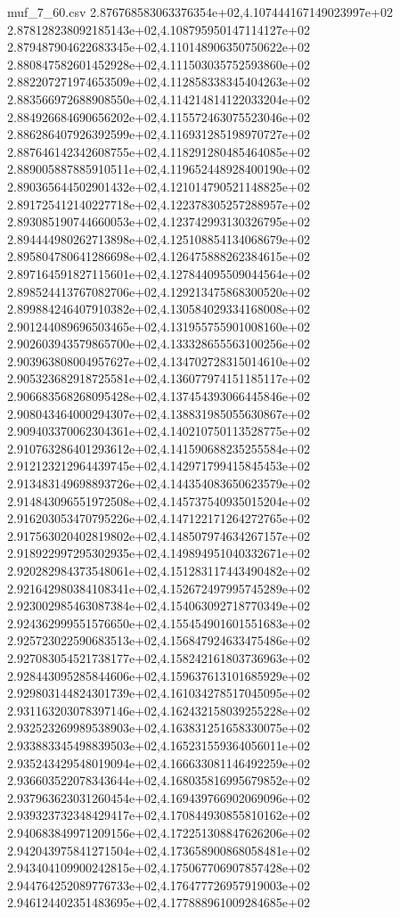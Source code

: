 \begin{filecontents*}{muf_7_60.csv}
2.876768583063376354e+02,4.107444167149023997e+02
2.878128238092185143e+02,4.108795950147114127e+02
2.879487904622683345e+02,4.110148906350750622e+02
2.880847582601452928e+02,4.111503035752593860e+02
2.882207271974653509e+02,4.112858338345404263e+02
2.883566972688908550e+02,4.114214814122033204e+02
2.884926684690656202e+02,4.115572463075523046e+02
2.886286407926392599e+02,4.116931285198970727e+02
2.887646142342608755e+02,4.118291280485464085e+02
2.889005887885910511e+02,4.119652448928400190e+02
2.890365644502901432e+02,4.121014790521148825e+02
2.891725412140227718e+02,4.122378305257288957e+02
2.893085190744660053e+02,4.123742993130326795e+02
2.894444980262713898e+02,4.125108854134068679e+02
2.895804780641286698e+02,4.126475888262384615e+02
2.897164591827115601e+02,4.127844095509044564e+02
2.898524413767082706e+02,4.129213475868300520e+02
2.899884246407910382e+02,4.130584029334168008e+02
2.901244089696503465e+02,4.131955755901008160e+02
2.902603943579865700e+02,4.133328655563100256e+02
2.903963808004957627e+02,4.134702728315014610e+02
2.905323682918725581e+02,4.136077974151185117e+02
2.906683568268095428e+02,4.137454393066445846e+02
2.908043464000294307e+02,4.138831985055630867e+02
2.909403370062304361e+02,4.140210750113528775e+02
2.910763286401293612e+02,4.141590688235255584e+02
2.912123212964439745e+02,4.142971799415845453e+02
2.913483149698893726e+02,4.144354083650623579e+02
2.914843096551972508e+02,4.145737540935015204e+02
2.916203053470795226e+02,4.147122171264272765e+02
2.917563020402819802e+02,4.148507974634267157e+02
2.918922997295302935e+02,4.149894951040332671e+02
2.920282984373548061e+02,4.151283117443490482e+02
2.921642980384108341e+02,4.152672497995745289e+02
2.923002985463087384e+02,4.154063092718770349e+02
2.924362999551576650e+02,4.155454901601551683e+02
2.925723022590683513e+02,4.156847924633475486e+02
2.927083054521738177e+02,4.158242161803736963e+02
2.928443095285844606e+02,4.159637613101685929e+02
2.929803144824301739e+02,4.161034278517045095e+02
2.931163203078397146e+02,4.162432158039255228e+02
2.932523269989538903e+02,4.163831251658330075e+02
2.933883345498839503e+02,4.165231559364056011e+02
2.935243429548019094e+02,4.166633081146492259e+02
2.936603522078343644e+02,4.168035816995679852e+02
2.937963623031260454e+02,4.169439766902069096e+02
2.939323732348429417e+02,4.170844930855810162e+02
2.940683849971209156e+02,4.172251308847626206e+02
2.942043975841271504e+02,4.173658900868058481e+02
2.943404109900242815e+02,4.175067706907857428e+02
2.944764252089776733e+02,4.176477726957919003e+02
2.946124402351483695e+02,4.177888961009284685e+02

\end{filecontents*}
